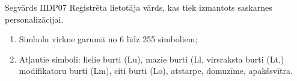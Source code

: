 \parameterTable
{Segvārds}
{IIDP07}
{
	Reģistrēta lietotāja vārds, kas tiek izmantots saskarnes personalizācijai.
}
{
	\begin{enumerate}
		\item Simbolu virkne garumā no 6 līdz 255 simboliem;
		\item Atļautie simboli: lielie burti (Lu), mazie burti (Ll, virsraksta burti (Lt,) modifikatoru burti (Lm), citi burti (Lo), atstarpe, domuzīme, apakšsvītra.
	\end{enumerate}
}
{
}
